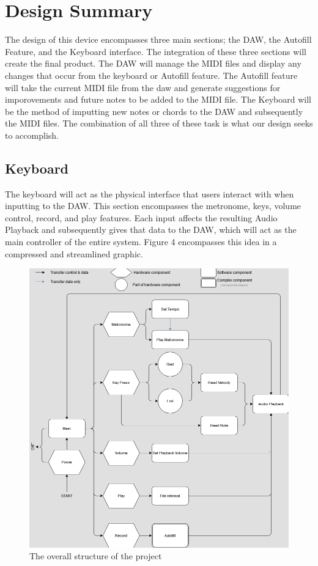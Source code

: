 \section{Design Summary}

The design of this device encompasses three main sections; the DAW, the Autofill Feature,
and the Keyboard interface. The integration of these three sections will create the final
product. The DAW will manage the MIDI files and display any changes that occur from the
keyboard or Autofill feature. The Autofill feature will take the current MIDI file from
the daw and generate suggestions for imporovements and future notes to be added to the
MIDI file. The Keyboard will be the method of imputting new notes or chords to the DAW and
subsequently the MIDI files. The combination of all three of these task is what our design
seeks to accomplish.

\newpage
\subsection{Keyboard}

The keyboard will act as the physical interface that users interact with when inputting to
the DAW. This section encompasses the metronome, keys, volume control, record, and play
features. Each input affects the resulting Audio Playback and subsequently gives that data
to the DAW, which will act as the main controller of the entire system. Figure 4
encompasses this idea in a compressed and streamlined graphic.

\begin{figure}[h!]
  \centering
  \includegraphics[width=\linewidth]{image/Keyboard.png}
  \caption{The overall structure of the project}
  \label{fig:keyboard_diagram}
\end{figure}

